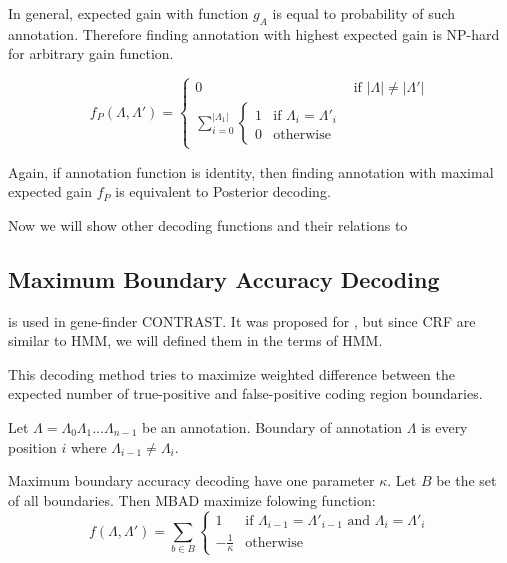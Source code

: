 In general, expected gain with function $g_A$ is equal to probability of such
annotation. Therefore finding annotation with highest expected gain is NP-hard
for arbitrary gain function.

\begin{equation}
f_P(\Lambda,\Lambda') = 
\begin{cases}
0 & \text{if $|\Lambda|\not=|\Lambda'|$}\\
\sum_{i=0}^{|\Lambda_1|}\begin{cases}
1 & \text{if $\Lambda_i=\Lambda'_i$}\\
0 & \text{otherwise}
\end{cases}
\end{cases}
\end{equation}

Again, if annotation function is identity, then finding annotation with maximal
expected gain $f_P$ is equivalent to Posterior decoding. 

Now we will show other decoding functions and their relations to

\subsection{Maximum Boundary Accuracy Decoding}

\cite{} is used in gene-finder
CONTRAST\cite{}. It
was proposed for , but since CRF
are similar to HMM, we will defined them in the terms of HMM.

This decoding method tries to maximize weighted difference between the expected
number of true-positive and false-positive coding region boundaries.

\begin{definition}
Let $\Lambda=\Lambda_0\Lambda_1\dots\Lambda_{n-1}$ be an annotation. Boundary of
annotation $\Lambda$ is every position $i$ where $\Lambda_{i-1}\not=\Lambda_i$. 
\end{definition}

Maximum boundary accuracy decoding have one parameter $\kappa$. Let $B$ be the
set of all boundaries. Then MBAD maximize folowing function:
\begin{equation}
f(\Lambda,\Lambda')=\sum_{b\in B}
\begin{cases}
1 & \text{if $\Lambda_{i-1}=\Lambda'_{i-1}$ and $\Lambda_{i}=\Lambda'_{i}$}\\
-\frac1\kappa & \text{otherwise}
\end{cases}
\end{equation}

